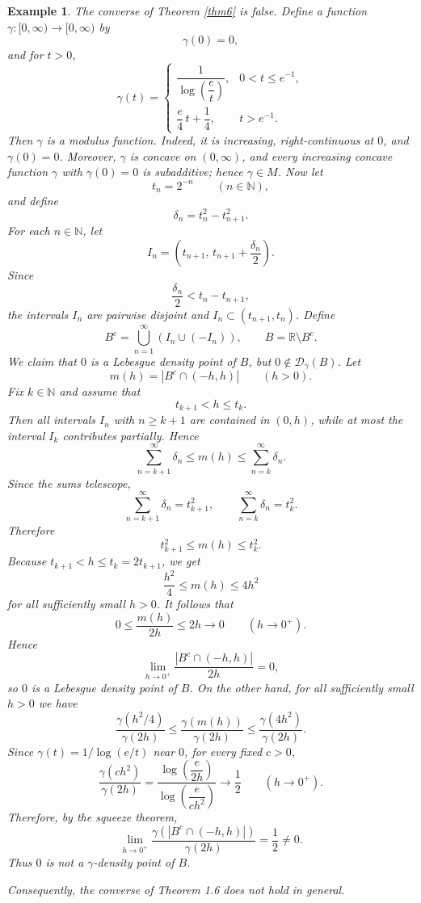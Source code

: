 \documentclass{amsart}
\theoremstyle{plain}
\newtheorem{example}{Example}
\numberwithin{equation}{section}
\begin{document}
\begin{example} \label{ex1.7}
The converse of Theorem \ref{thm6} is false.
Define a function $\gamma:[0,\infty)\to[0,\infty)$ by
$$\gamma(0)=0,$$
and for $t>0$,
$$
\gamma(t)=
\begin{cases}
\dfrac{1}{\log \!\left(\dfrac{e}{t}\right)}, & 0<t\le e^{-1},\\[2mm]
\dfrac{e}{4}\,t+\dfrac14, & t>e^{-1}.
\end{cases}
$$
Then $\gamma$ is a modulus function. Indeed, it is increasing, right-continuous at $0$, and
$\gamma(0)=0$. Moreover, $\gamma$ is concave on $(0,\infty)$, and every increasing concave
function $\gamma$ with $\gamma(0)=0$ is subadditive; hence $\gamma\in M$.
Now let $$ t_n=2^{-n}\qquad (n\in\mathbb N), $$
and define
$$\delta_n=t_n^2-t_{n+1}^2. $$
For each $n\in\mathbb N$, let
$$I_n=\left(t_{n+1},\, t_{n+1}+\frac{\delta_n}{2}\right).$$
Since
$$\frac{\delta_n}{2}<t_n-t_{n+1},$$
the intervals $I_n$ are pairwise disjoint and $I_n\subset (t_{n+1},t_n)$.
Define
$$B^c=\bigcup_{n=1}^\infty (I_n\cup(-I_n)),
\qquad B=\mathbb R\setminus B^c .$$
We claim that $0$ is a Lebesgue density point of $B$, but $0\notin \mathcal{D}_\gamma(B)$.
Let
$$m(h)=|B^c\cap(-h,h)| \qquad (h>0). $$
Fix $k\in\mathbb N$ and assume that
$$t_{k+1}<h\le t_k . $$
Then all intervals $I_n$ with $n\ge k+1$ are contained in $(0,h)$, while at most the interval
$I_k$ contributes partially. Hence
$$\sum_{n=k+1}^\infty \delta_n \le m(h)\le \sum_{n=k}^\infty \delta_n .$$
Since the sums telescope,
$$\sum_{n=k+1}^\infty \delta_n=t_{k+1}^2, \qquad
\sum_{n=k}^\infty \delta_n=t_k^2. $$
Therefore
$$t_{k+1}^2\le m(h)\le t_k^2. $$
Because $t_{k+1}<h\le t_k=2t_{k+1}$, we get
$$\frac{h^2}{4}\le m(h)\le 4h^2$$
for all sufficiently small $h>0$.
It follows that
$$0\le \frac{m(h)}{2h}\le 2h \longrightarrow 0 \qquad (h\to0^+). $$
Hence $$ \lim_{h\to0^+}\frac{|B^c\cap(-h,h)|}{2h}=0, $$
so $0$ is a Lebesgue density point of $B$.
On the other hand, for all sufficiently small $h>0$ we have
$$
\frac{\gamma(h^2/4)}{\gamma(2h)}
\le
\frac{\gamma(m(h))}{\gamma(2h)}
\le
\frac{\gamma(4h^2)}{\gamma(2h)}.
$$
Since $\gamma(t)=1/\log(e/t)$ near $0$, for every fixed $c>0$,
$$
\frac{\gamma(ch^2)}{\gamma(2h)}
=
\frac{\log\!\left(\dfrac{e}{2h}\right)}
     {\log\!\left(\dfrac{e}{ch^2}\right)}
\longrightarrow \frac12
\qquad (h\to0^+).
$$
Therefore, by the squeeze theorem,
$$ \lim_{h\to0^+}\frac{\gamma(|B^c\cap(-h,h)|)}{\gamma(2h)}=\frac12\neq 0. $$
Thus $0$ is not a $\gamma$-density point of $B$.

Consequently, the converse of Theorem 1.6 does not hold in general.
\end{example}
\end{document}

